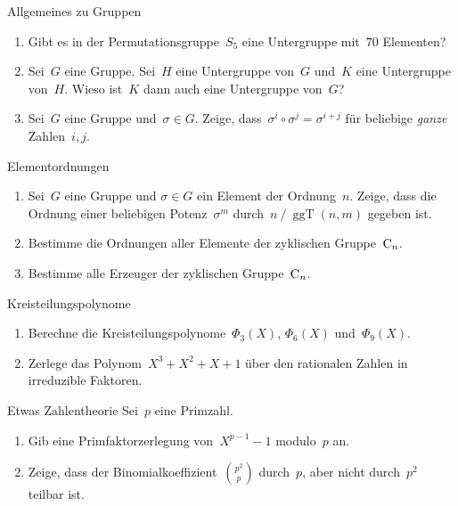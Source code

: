 \documentclass{algblatt}
\begin{document}
\vspace*{-1.5cm}

\begin{aufgabe}{Allgemeines zu Gruppen}
\begin{enumerate}
\item Gibt es in der Permutationsgruppe~$S_5$ eine Untergruppe mit~$70$
Elementen?

\item Sei~$G$ eine Gruppe. Sei~$H$ eine Untergruppe von~$G$ und~$K$ eine
Untergruppe von~$H$. Wieso ist~$K$ dann auch eine Untergruppe von~$G$?

\item Sei~$G$ eine Gruppe und~$\sigma \in G$. Zeige, dass~$\sigma^i \circ
\sigma^j = \sigma^{i + j}$ für beliebige \emph{ganze} Zahlen~$i,j$.
\end{enumerate}
\end{aufgabe}

\begin{aufgabe}{Elementordnungen}
\begin{enumerate}
\item Sei~$G$ eine Gruppe und $\sigma \in G$ ein Element der Ordnung~$n$.
Zeige, dass die Ordnung einer be\-lie\-bi\-gen Potenz~$\sigma^m$ durch~$n \mathrel{/}
\operatorname{ggT}(n,m)$ gegeben ist.

\item Bestimme die Ordnungen aller Elemente der zyklischen Gruppe~$\mathrm{C}_n$.

\item Bestimme alle Erzeuger der zyklischen Gruppe~$\mathrm{C}_n$.
\end{enumerate}
\end{aufgabe}

\begin{aufgabe}{Kreisteilungspolynome}
\begin{enumerate}
\item Berechne die Kreisteilungspolynome~$\Phi_3(X)$, $\Phi_6(X)$
und~$\Phi_9(X)$.

\item Zerlege das Polynom~$X^3 + X^2 + X + 1$ über den rationalen Zahlen
in irreduzible Faktoren.
\end{enumerate}
\end{aufgabe}

\begin{aufgabe}{Etwas Zahlentheorie}
Sei~$p$ eine Primzahl.
\begin{enumerate}
\item Gib eine Primfaktorzerlegung von~$X^{p-1}-1$
modulo~$p$ an.
\item Zeige, dass der
Binomialkoeffizient~$\binom{p^2}{p}$ durch~$p$, aber nicht durch~$p^2$ teilbar
ist.
\end{enumerate}
\end{aufgabe}
\end{document}
